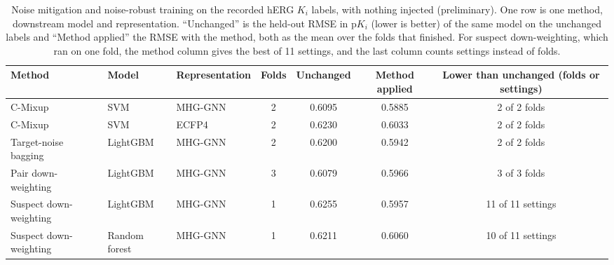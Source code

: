 \begin{table}[htbp]
\centering
\small
\begin{adjustbox}{max width=\textwidth}
\begin{tabular}{@{}lllcccc@{}}
\toprule
Method & Model & Representation & Folds & Unchanged & Method applied & Lower than unchanged (folds or settings) \\
\midrule
C-Mixup & SVM & MHG-GNN & 2 & 0.6095 & 0.5885 & 2 of 2 folds \\
C-Mixup & SVM & ECFP4 & 2 & 0.6230 & 0.6033 & 2 of 2 folds \\
Target-noise bagging & LightGBM & MHG-GNN & 2 & 0.6200 & 0.5942 & 2 of 2 folds \\
Pair down-weighting & LightGBM & MHG-GNN & 3 & 0.6079 & 0.5966 & 3 of 3 folds \\
Suspect down-weighting & LightGBM & MHG-GNN & 1 & 0.6255 & 0.5957 & 11 of 11 settings \\
Suspect down-weighting & Random forest & MHG-GNN & 1 & 0.6211 & 0.6060 & 10 of 11 settings \\
\bottomrule
\end{tabular}
\end{adjustbox}
\caption[Noise mitigation and noise-robust training on the recorded hERG $K_i$ labels (preliminary).]{Noise mitigation and noise-robust training on the recorded hERG $K_i$ labels, with nothing injected (preliminary). One row is one method, downstream model and representation. ``Unchanged'' is the held-out RMSE in p$K_i$ (lower is better) of the same model on the unchanged labels and ``Method applied'' the RMSE with the method, both as the mean over the folds that finished. For suspect down-weighting, which ran on one fold, the method column gives the best of 11 settings, and the last column counts settings instead of folds.}
\label{tab:ch6prelim_level0}
\end{table}

